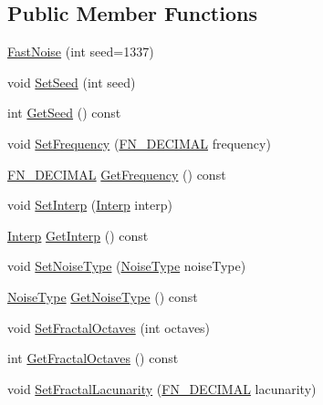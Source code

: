 \subsection*{Public Member Functions}
\begin{DoxyCompactItemize}
\item 
\mbox{\hyperlink{class_fast_noise_abe90bb52b45e18122d109dcb4b7fa987}{Fast\+Noise}} (int seed=1337)
\item 
void \mbox{\hyperlink{class_fast_noise_a2efb595ec8bc18541a3739c6bd9b7567}{Set\+Seed}} (int seed)
\item 
int \mbox{\hyperlink{class_fast_noise_ade53a483f6d63837f5be13867190363a}{Get\+Seed}} () const
\item 
void \mbox{\hyperlink{class_fast_noise_a4a16af07f18788c25e7515a9e1d2c53c}{Set\+Frequency}} (\mbox{\hyperlink{_fast_noise_8h_a75a9ef6d2541c4921815b885bfd449c3}{F\+N\+\_\+\+D\+E\+C\+I\+M\+AL}} frequency)
\item 
\mbox{\hyperlink{_fast_noise_8h_a75a9ef6d2541c4921815b885bfd449c3}{F\+N\+\_\+\+D\+E\+C\+I\+M\+AL}} \mbox{\hyperlink{class_fast_noise_a102aa79881c39779145806dcd48f1a9a}{Get\+Frequency}} () const
\item 
void \mbox{\hyperlink{class_fast_noise_a5db11de37bebf7a99f6788a9ae9d7bf9}{Set\+Interp}} (\mbox{\hyperlink{class_fast_noise_a60969f626ea3ea3504ea51d789f19a33}{Interp}} interp)
\item 
\mbox{\hyperlink{class_fast_noise_a60969f626ea3ea3504ea51d789f19a33}{Interp}} \mbox{\hyperlink{class_fast_noise_ab7cd259a2864b29a824deaf3c67a3b75}{Get\+Interp}} () const
\item 
void \mbox{\hyperlink{class_fast_noise_ae6cb2170c036bde4bc56ad7d0303e4bb}{Set\+Noise\+Type}} (\mbox{\hyperlink{class_fast_noise_a77adcfdc4d6e9410ef6099553509d09f}{Noise\+Type}} noise\+Type)
\item 
\mbox{\hyperlink{class_fast_noise_a77adcfdc4d6e9410ef6099553509d09f}{Noise\+Type}} \mbox{\hyperlink{class_fast_noise_aea513db44077037f31452d05f06d11e0}{Get\+Noise\+Type}} () const
\item 
void \mbox{\hyperlink{class_fast_noise_a7c7254a79a239e8014fd0078cee007dd}{Set\+Fractal\+Octaves}} (int octaves)
\item 
int \mbox{\hyperlink{class_fast_noise_a05f76e380ba40c1b90bbe1ca5b3ac3e1}{Get\+Fractal\+Octaves}} () const
\item 
void \mbox{\hyperlink{class_fast_noise_a2e5e8651bc949144ade310c748518fc2}{Set\+Fractal\+Lacunarity}} (\mbox{\hyperlink{_fast_noise_8h_a75a9ef6d2541c4921815b885bfd449c3}{F\+N\+\_\+\+D\+E\+C\+I\+M\+AL}} lacunarity)

\end{DoxyCompactItemize}
